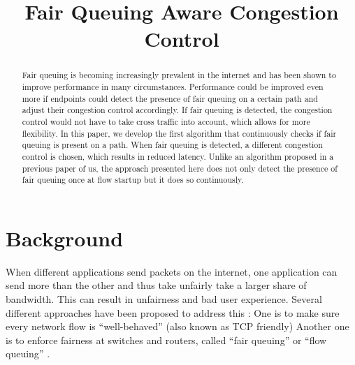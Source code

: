 \documentclass[conference]{IEEEtran}
\begin{document}
\title{Fair Queuing Aware Congestion Control}

\author{
}

\maketitle

\begin{abstract}
Fair queuing is becoming increasingly prevalent in the internet and has been shown to improve performance in many circumstances. 
Performance could be improved even more if endpoints could detect the presence of fair queuing on a certain path and adjust their congestion control accordingly. 
If fair queuing is detected, the congestion control would not have to take cross traffic into account, which allows for more flexibility. 
In this paper, we develop the first algorithm that continuously checks if fair queuing is present on a path. 
When fair queuing is detected, a different congestion control is chosen, which results in reduced latency. 
Unlike an algorithm proposed in a previous paper of us, the approach presented here does not only detect the presence of fair queuing once at flow startup but it does so continuously. 
\end{abstract}


\section{Background}

When different applications send packets on the internet, one application can send more than the other and thus take unfairly take a larger share of bandwidth. 
This can result in unfairness and bad user experience. Several different approaches have been proposed to address this \cite{brown_future_2020,ware_beyond_2019} : One is to make sure every network flow is ``well-behaved'' (also known as TCP friendly)
Another one is to enforce fairness at switches and routers, called ``fair queuing'' or ``flow queuing'' \cite{nagle_packet_1985}. 
\end{document}
